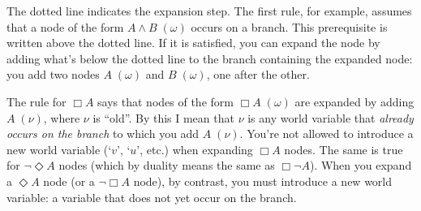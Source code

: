 \vspace{10mm}\noindent%
\begin{minipage}{0.33\textwidth}\centering
{}
\end{minipage}
\begin{minipage}{0.33\textwidth}\centering
{}
\end{minipage}
\begin{minipage}{0.33\textwidth}\centering
{}
\end{minipage}

\vspace{10mm}\noindent%
\begin{minipage}{0.33\textwidth}\centering
{}
\end{minipage}

\vspace{5mm}

The dotted line indicates the expansion step. The first rule, for example,
assumes that a node of the form $A \land B \;(\omega)$ occurs on a branch. This
prerequisite is written above the dotted line. If it is satisfied, you can
expand the node by adding what's below the dotted line to the branch containing
the expanded node: you add two nodes $A \;(\omega)$ and $B\;(\omega)$, one after
the other.

The rule for $\Box A$ says that nodes of the form $\Box A \;(\omega)$ are
expanded by adding $A \;(\nu)$, where $\nu$ is ``old''. By this I mean that
$\nu$ is any world variable that \emph{already occurs on the branch} to which
you add $A \;(\nu)$. You're not allowed to introduce a new world variable
(`$v$', `$u$', etc.) when expanding $\Box A$ nodes. The same is true for
$\neg \Diamond A$ nodes (which by duality means the same as $\Box \neg A$). When
you expand a $\Diamond A$ node (or a $\neg \Box A$ node), by contrast, you must
introduce a new world variable: a variable that does not yet occur on the
branch.

